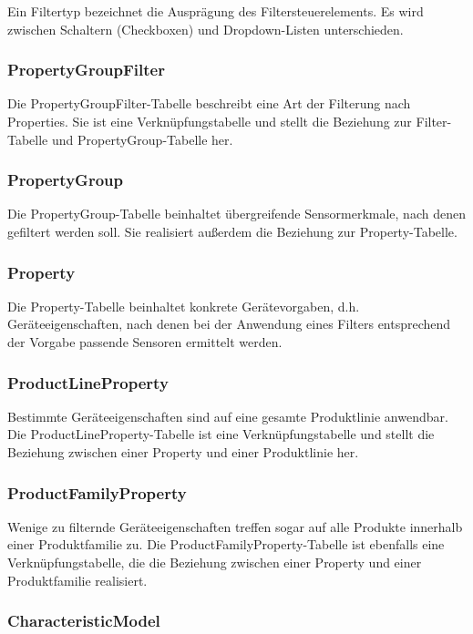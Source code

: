 Ein Filtertyp bezeichnet die Ausprägung des Filtersteuerelements. Es wird zwischen Schaltern (Checkboxen) und Dropdown-Listen unterschieden.

\subsubsection{PropertyGroupFilter}

Die PropertyGroupFilter-Tabelle beschreibt eine Art der Filterung nach Properties. Sie ist eine Verknüpfungstabelle und stellt die Beziehung zur Filter-Tabelle und PropertyGroup-Tabelle her.

\subsubsection{PropertyGroup}

Die PropertyGroup-Tabelle beinhaltet übergreifende Sensormerkmale, nach denen gefiltert werden soll. Sie realisiert außerdem die Beziehung zur Property-Tabelle.

\subsubsection{Property}

Die Property-Tabelle beinhaltet konkrete Gerätevorgaben, d.h. Geräteeigenschaften, nach denen bei der Anwendung eines Filters entsprechend der Vorgabe passende Sensoren ermittelt werden.

\subsubsection{ProductLineProperty}

Bestimmte Geräteeigenschaften sind auf eine gesamte Produktlinie anwendbar. Die ProductLineProperty-Tabelle ist eine Verknüpfungstabelle und stellt die Beziehung zwischen einer Property und einer Produktlinie her.

\subsubsection{ProductFamilyProperty}

Wenige zu filternde Geräteeigenschaften treffen sogar auf alle Produkte innerhalb einer Produktfamilie zu. Die ProductFamilyProperty-Tabelle ist ebenfalls eine Verknüpfungstabelle, die die Beziehung zwischen einer Property und einer Produktfamilie realisiert.

\subsubsection{CharacteristicModel}

